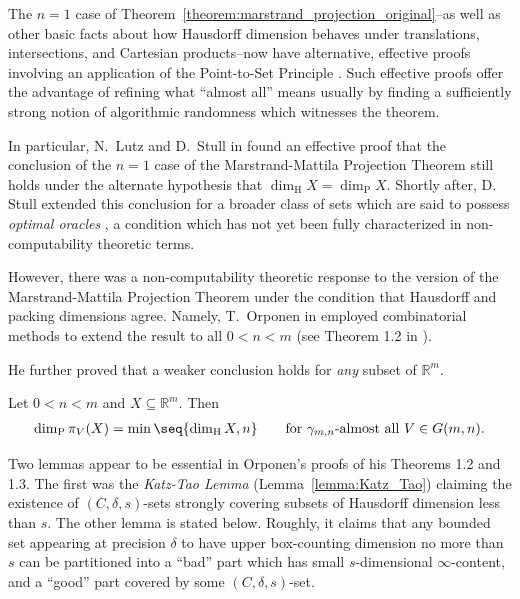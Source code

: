 The $n = 1$ case of Theorem~\ref{theorem:marstrand_projection_original}--as well as other basic facts about how Hausdorff dimension behaves under translations, intersections, and Cartesian products--now have alternative, effective proofs involving an application of the Point-to-Set Principle \cite{LS17, Lut21}. Such effective proofs offer the advantage of refining what ``almost all'' means usually by finding a sufficiently strong notion of algorithmic randomness which witnesses the theorem.

In particular, N.~Lutz and D.~Stull in \cite{LS17} found an effective proof that the conclusion of the $n = 1$ case of the Marstrand-Mattila Projection Theorem still holds under the alternate hypothesis that $\dim_{\operatorname{H}} X = \dim_{\operatorname{P}} X$. Shortly after, D. Stull extended this conclusion for a broader class of sets which are said to possess \textit{optimal oracles} \cite{Stu21}, a condition which has not yet been fully characterized in non-computability theoretic terms. 

However, there was a non-computability theoretic response to the version of the Marstrand-Mattila Projection Theorem under the condition that Hausdorff and packing dimensions agree. Namely, T.~Orponen in \cite{Orp21} employed combinatorial methods to extend the result to all $0 < n < m$ (see Theorem 1.2 in \cite{Orp21}). 

He further proved that a weaker conclusion holds for \textit{any} subset of $\mathbb{R}^m$.
\begin{theorem}
    \label{theorem:Orponen_weak_Marstrand}
    Let $0 < n < m$ and $X \subseteq \mathbb{R}^m$. Then 
    \begin{align*}
        \dim_{\operatorname{P}} \pi_V(X) = \min \seq{\dim_{\operatorname{H}} X, n} \qquad \text{for $\gamma_{m, n}$-almost all $V \in G(m, n)$}.
    \end{align*}
\end{theorem}

Two lemmas appear to be essential in Orponen's proofs of his Theorems 1.2 and 1.3. The first was the \textit{Katz-Tao Lemma} (Lemma~\ref{lemma:Katz_Tao}) claiming the existence of $(C, \delta, s)$-sets strongly covering subsets of Hausdorff dimension less than $s$. The other lemma is stated below. Roughly, it claims that any bounded set appearing at precision $\delta$ to have upper box-counting dimension no more than $s$ can be partitioned into a ``bad'' part which has small $s$-dimensional $\infty$-content, and a ``good'' part covered by some $(C, \delta, s)$-set. 

